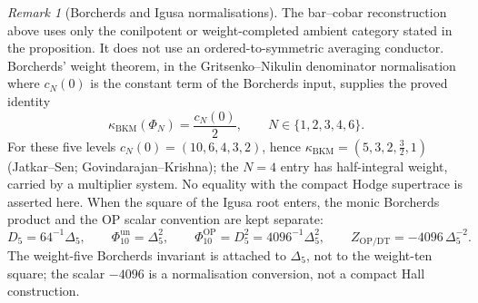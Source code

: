 \documentclass[11pt]{amsart}
\theoremstyle{definition}
\theoremstyle{remark}
\newtheorem{remark}[theorem]{Remark}
\begin{document}
\begin{remark}[Borcherds and Igusa normalisations]
The bar--cobar reconstruction above uses only the conilpotent or
weight-completed ambient category stated in the proposition. It does not use
an ordered-to-symmetric averaging conductor. Borcherds' weight theorem, in
the Gritsenko--Nikulin denominator normalisation where \(c_N(0)\) is the
constant term of the Borcherds input, supplies the proved identity
\[
        \kappa_{\mathrm{BKM}}(\Phi_N)=\frac{c_N(0)}{2},
        \qquad N\in\{1,2,3,4,6\}.
\]
For these five levels \(c_N(0)=(10,6,4,3,2)\), hence
\(\kappa_{\mathrm{BKM}}=(5,3,2,\tfrac32,1)\) (Jatkar--Sen;
Govindarajan--Krishna); the \(N=4\) entry has half-integral weight,
carried by a multiplier system. No equality with the compact Hodge
supertrace is asserted here. When the square of the Igusa root enters, the
monic Borcherds product and the OP scalar convention are kept separate:
\[
        D_5=64^{-1}\Delta_5,\qquad
        \Phi_{10}^{\mathrm{un}}=\Delta_5^2,\qquad
        \Phi_{10}^{\mathrm{OP}}=D_5^2=4096^{-1}\Delta_5^2,\qquad
        Z_{\mathrm{OP/DT}}=-4096\,\Delta_5^{-2}.
\]
The weight-five Borcherds invariant is attached to \(\Delta_5\), not to the
weight-ten square; the scalar \(-4096\) is a normalisation conversion, not a
compact Hall construction.
\end{remark}
\end{document}
